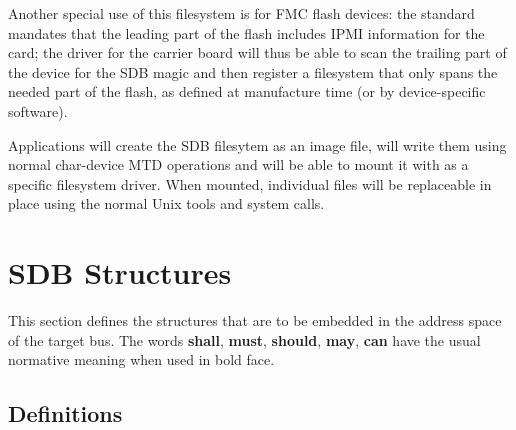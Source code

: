 \documentclass[a4paper, 12pt]{article}
\begin{document}
Another special use of this filesystem is for FMC flash devices: the
standard mandates that the leading part of the flash includes IPMI
information for the card; the driver for the carrier board will thus
be able to scan the trailing part of the device for the SDB magic and
then register a filesystem that only spans the needed part of the
flash, as defined at manufacture time (or by device-specific
software).

Applications will create the SDB filesytem as an image file, will
write them using normal char-device MTD operations and will be able to
mount it with as a specific filesystem driver. When mounted,
individual files will be replaceable in place using the normal Unix
tools and system calls.



\section{SDB Structures}

This section defines the structures that are to be embedded in the
address space of the target bus.  The words \textbf{shall},
\textbf{must}, \textbf{should}, \textbf{may}, \textbf{can} have the
usual normative meaning when used in bold face.

\subsection{Definitions}
\end{document}
